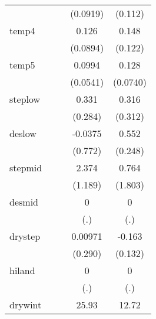 {\begin{tabular}{l*{4}{c}}
            &                     &                     &    (0.0919)         &     (0.112)         \\
[1em]
temp4       &                     &                     &       0.126         &       0.148         \\
            &                     &                     &    (0.0894)         &     (0.122)         \\
[1em]
temp5       &                     &                     &      0.0994         &       0.128         \\
            &                     &                     &    (0.0541)         &    (0.0740)         \\
[1em]
steplow     &                     &                     &       0.331         &       0.316         \\
            &                     &                     &     (0.284)         &     (0.312)         \\
[1em]
deslow      &                     &                     &     -0.0375         &       0.552\sym{*}  \\
            &                     &                     &     (0.772)         &     (0.248)         \\
[1em]
stepmid     &                     &                     &       2.374         &       0.764         \\
            &                     &                     &     (1.189)         &     (1.803)         \\
[1em]
desmid      &                     &                     &           0         &           0         \\
            &                     &                     &         (.)         &         (.)         \\
[1em]
drystep     &                     &                     &     0.00971         &      -0.163         \\
            &                     &                     &     (0.290)         &     (0.132)         \\
[1em]
hiland      &                     &                     &           0         &           0         \\
            &                     &                     &         (.)         &         (.)         \\
[1em]
drywint     &                     &                     &       25.93         &       12.72         \\

\end{tabular}}

